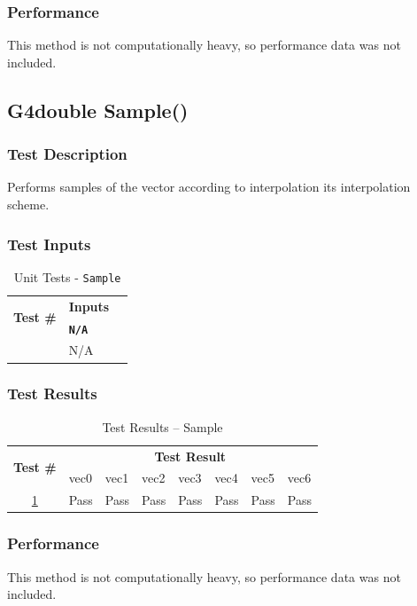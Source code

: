 \documentclass[12pt]{article}
\newcounter{TestCounter}
\begin{document}
	\subsubsection{Performance}
		This method is not computationally heavy, so performance data was not included.

\subsection{G4double Sample()}%
	\subsubsection{Test Description}
	  Performs samples of the vector according to interpolation its interpolation scheme.
	
	\subsubsection{Test Inputs}
		\begin{table}[H]
		\centering
		\caption{Unit Tests - \texttt{Sample}}\label{Sample_unit}
		\begin{tabular}{lll}
		\toprule
		\multirow{2}{*}{\bf Test \#}  & \multicolumn{1}{c}{\bf Inputs}\\
		& \bf \texttt{N/A}\\\midrule
		{TestCounter}\arabic{TestCounter}\label{Sample_0} & N/A \\
		\bottomrule
		\end{tabular}
		\end{table}
	
	\subsubsection{Test Results}
		\begin{table}[H]
		\centering
		\caption{Test Results -- Sample}\label{Sample_acc}
		\begin{tabular}{clllllll}
		\toprule
		\multirow{2}{*}{\bf Test \#} & \multicolumn{7}{c}{\bf Test Result}\\
		& vec0 & vec1 & vec2 & vec3 & vec4 & vec5 & vec6\\\midrule
		\ref{Sample_0} & Pass & Pass & Pass & Pass & Pass & Pass & Pass\\
		\bottomrule
		\end{tabular}
		\end{table}

	\subsubsection{Performance}
		This method is not computationally heavy, so performance data was not included.
		
\end{document}
